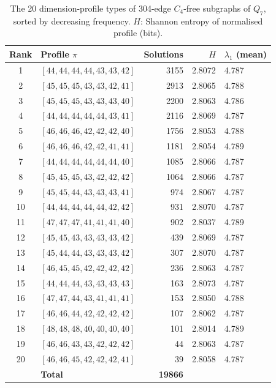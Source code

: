 \documentclass[12pt,a4paper]{article}
\theoremstyle{definition}
\begin{document}
\begin{table}[ht]
\centering\small
\caption{The 20 dimension-profile types of 304-edge $C_4$-free subgraphs of
  $Q_7$, sorted by decreasing frequency.
  $H$: Shannon entropy of normalised profile (bits).}
\label{tab:types}\medskip
\begin{tabular}{clrrl}
\toprule
Rank & Profile $\pi$ & Solutions & $H$ & $\lambda_1$ (mean)\\
\midrule
 1 & $[44,44,44,44,43,43,42]$ & 3155 & 2.8072 & 4.787\\
 2 & $[45,45,45,43,43,42,41]$ & 2913 & 2.8065 & 4.788\\
 3 & $[45,45,45,43,43,43,40]$ & 2200 & 2.8063 & 4.786\\
 4 & $[44,44,44,44,44,43,41]$ & 2116 & 2.8069 & 4.787\\
 5 & $[46,46,46,42,42,42,40]$ & 1756 & 2.8053 & 4.788\\
 6 & $[46,46,46,42,42,41,41]$ & 1181 & 2.8054 & 4.789\\
 7 & $[44,44,44,44,44,44,40]$ & 1085 & 2.8066 & 4.787\\
 8 & $[45,45,45,43,42,42,42]$ & 1064 & 2.8066 & 4.787\\
 9 & $[45,45,44,43,43,43,41]$ &  974 & 2.8067 & 4.787\\
10 & $[44,44,44,44,44,42,42]$ &  931 & 2.8070 & 4.787\\
11 & $[47,47,47,41,41,41,40]$ &  902 & 2.8037 & 4.789\\
12 & $[45,45,43,43,43,43,42]$ &  439 & 2.8069 & 4.787\\
13 & $[45,44,44,43,43,43,42]$ &  307 & 2.8070 & 4.787\\
14 & $[46,45,45,42,42,42,42]$ &  236 & 2.8063 & 4.787\\
15 & $[44,44,44,43,43,43,43]$ &  163 & 2.8073 & 4.787\\
16 & $[47,47,44,43,41,41,41]$ &  153 & 2.8050 & 4.788\\
17 & $[46,46,44,42,42,42,42]$ &  107 & 2.8062 & 4.787\\
18 & $[48,48,48,40,40,40,40]$ &  101 & 2.8014 & 4.789\\
19 & $[46,46,43,43,42,42,42]$ &   44 & 2.8063 & 4.787\\
20 & $[46,46,45,42,42,42,41]$ &   39 & 2.8058 & 4.787\\
\midrule
   & \textbf{Total}           & \textbf{19866}\\
\bottomrule
\end{tabular}
\end{table}
\end{document}
